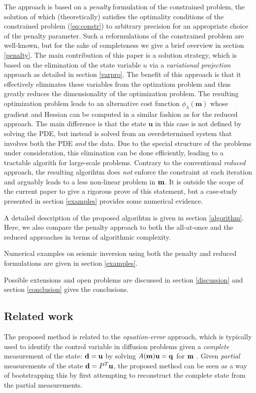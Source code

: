 \documentclass{iopart}
\begin{document}
The approach is based on a \emph{penalty} formulation of the constrained problem,
the solution of which (theoretically) satisfies the optimality conditions of the constrained problem (\ref{eq:constr}) 
to arbitrary precision for an appropriate choice of the penalty parameter.
Such a reformulations of the constrained problem are well-known, 
but for the sake of completeness we give a brief overview in section \ref{penalty}. The main contribution
of this paper is a solution strategy, which is based on the elimination of the state variable $u$ via
a \emph{variational projection} approach as detailed in section \ref{varpro}. The benefit of this approach is
that it effectively eliminates these variables from the optizatiom problem and thus greatly reduces the dimensionality
of the optimization problem. The resulting optimization problem leads to an alternative cost function $\phi_{\lambda}(\mathbf{m})$
whose gradient and Hessian can be computed in a similar fashion as for the reduced approach. The main difference is that
the state $\mathbf{u}$ in this case is not defined by solving the PDE, but instead is solved from an overdetermined
system that involves both the PDE \emph{and} the data. Due to the special structure of the problems under consideration, this elimination 
can be done efficiently, leading to a tractable algorith for large-scale problems. 
Contrary to the conventional \emph{reduced} approach, the resulting algorihtm does \emph{not} enforce the constraint
at each iteration and arguably leads to a less non-linear problem in $\mathbf{m}$. It is outside the scope of the current
paper to give a rigorous prove of this statement, but a case-study presented in section
 \ref{examples} provides some numerical evidence.

A detailed description of the proposed algorihtm is given in section \ref{algorithm}.
Here, we also compare the penalty approach to both the all-at-once and the
reduced approaches in terms of algorithmic complexity.

Numerical examples on seismic inversion using both the penalty and reduced
formulations are given in section \ref{examples}.

Possible extensions and open problems are discussed in section
\ref{discussion} and section \ref{conclusion} gives the conclusions.

\subsection{Related work}
The proposed method is related to the \emph{equation-error} approach,
which is typically used to identify the control variable in diffusion
problems given a \emph{complete} measurement of the state: $\mathbf{d} = \mathbf{u}$ by
solving $A(\mathbf{m})\mathbf{u} = \mathbf{q}$ for $\mathbf{m}$ \cite{Richter1981,Banerjee2013}. 
Given \emph{partial} measurements of the state $\mathbf{d} = P^T\mathbf{u}$, the proposed method can be seen as a
way of bootstrapping this by first attempting to reconstruct the complete
state from the partial measurements. 
\end{document}
